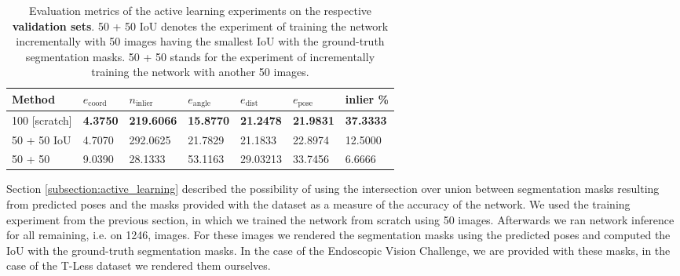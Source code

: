 \begin{table}[b]
\centering
\begin{tabular}{|l||llllll|} \hline
Method            & $e_{\text{coord}}$ & $n_{\text{inlier}}$ & $e_{\text{angle}}$ & $e_{\text{dist}}$ & $e_{\text{pose}}$  & inlier \% \\ \hline \hline \rowcolor{Gray}
100 {[}scratch{]} & \textbf{4.3750}             & \textbf{219.6066}                 & \textbf{15.8770}             & \textbf{21.2478}            & \textbf{21.9831}      & \textbf{37.3333} \\ \hline
50 + 50 IoU       & 4.7070             & 292.0625                & 21.7829             & 21.1833           & 22.8974  & 12.5000 \\ \hline \rowcolor{Gray}
50 + 50           & 9.0390             & 28.1333                   & 53.1163           & 29.03213           & 33.7456  &6.6666   \\ \hline      
\end{tabular}
\caption{Evaluation metrics of the active learning experiments on the respective \textbf{validation sets}. 50 + 50 IoU denotes the experiment of training the network incrementally with 50 images having the smallest IoU with the ground-truth segmentation masks. 50 + 50 stands for the experiment of incrementally training the network with another 50 images.}
\label{table:active_learning_val}
\end{table}

Section \ref{subsection:active_learning} described the possibility of using the intersection over union between segmentation masks resulting from predicted poses and the masks provided with the dataset as a measure of the accuracy of the network. We used the training experiment from the previous section, in which we trained the network from scratch using 50 images. Afterwards we ran network inference for all remaining, i.e. on 1246, images. For these images we rendered the segmentation masks using the predicted poses and computed the IoU with the ground-truth segmentation masks. In the case of the Endoscopic Vision Challenge, we are provided with these masks, in the case of the T-Less dataset we rendered them ourselves. 

